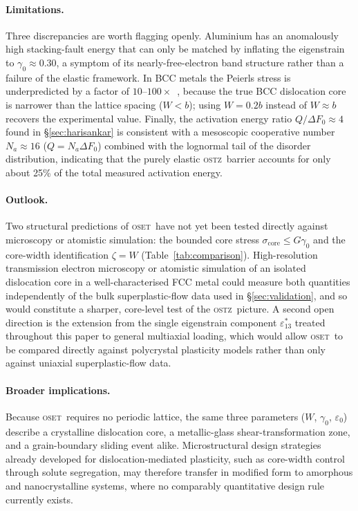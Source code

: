 \documentclass[5p,sort&compress]{elsarticle}
\newcommand{\OSTZ}{\textsc{ostz}}
\newcommand{\OSET}{\textsc{oset}}
\newcommand{\dF}{\Delta F_0}
\newcommand{\gz}{\gamma_0}
\begin{document}
\paragraph{Limitations.}
Three discrepancies are worth flagging openly. Aluminium has an
anomalously high stacking-fault energy that can only be matched by
inflating the eigenstrain to $\gz\approx0.30$, a symptom of its
nearly-free-electron band structure rather than a failure of the
elastic framework. In BCC metals the Peierls stress is
underpredicted by a factor of $10$--$100\times$~\cite{nabarro1997},
because the true BCC dislocation core is narrower than the lattice
spacing ($W<b$); using $W=0.2b$ instead of $W\approx b$ recovers the
experimental value. Finally, the activation energy ratio
$Q/\dF\approx4$ found in \S\ref{sec:harisankar} is consistent with a
mesoscopic cooperative number $N_a\approx16$ ($Q=N_a\dF$) combined
with the lognormal tail of the disorder distribution, indicating
that the purely elastic \OSTZ\ barrier accounts for only about 25\%
of the total measured activation energy.

\paragraph{Outlook.}
Two structural predictions of \OSET\ have not yet been tested
directly against microscopy or atomistic simulation: the bounded
core stress $\sigma_\text{core}\le G\gz$ and the core-width
identification $\zeta=W$ (Table~\ref{tab:comparison}). High-resolution
transmission electron microscopy or atomistic simulation of an
isolated dislocation core in a well-characterised FCC metal could
measure both quantities independently of the bulk superplastic-flow
data used in \S\ref{sec:validation}, and so would constitute a
sharper, core-level test of the \OSTZ\ picture. A second open
direction is the extension from the single eigenstrain component
$\varepsilon^*_{13}$ treated throughout this paper to general
multiaxial loading, which would allow \OSET\ to be compared directly
against polycrystal plasticity models rather than only against
uniaxial superplastic-flow data.

\paragraph{Broader implications.}
Because \OSET\ requires no periodic lattice, the same three
parameters ($W$, $\gz$, $\varepsilon_0$) describe a crystalline
dislocation core, a metallic-glass shear-transformation zone, and a
grain-boundary sliding event alike. Microstructural design strategies
already developed for dislocation-mediated plasticity, such as
core-width control through solute segregation, may therefore transfer
in modified form to amorphous and nanocrystalline systems, where no
comparably quantitative design rule currently exists.
\end{document}

